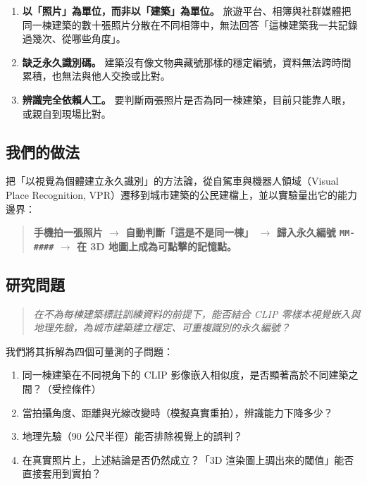 \documentclass[11pt,a4paper,fontset=windows]{ctexart}
\begin{document}
\begin{enumerate}[leftmargin=1.4em,itemsep=2pt]
  \item \textbf{以「照片」為單位，而非以「建築」為單位。} 旅遊平台、相簿與社群媒體把同一棟建築的數十張照片分散在不同相簿中，無法回答「這棟建築我一共記錄過幾次、從哪些角度」。
  \item \textbf{缺乏永久識別碼。} 建築沒有像文物典藏號那樣的穩定編號，資料無法跨時間累積，也無法與他人交換或比對。
  \item \textbf{辨識完全依賴人工。} 要判斷兩張照片是否為同一棟建築，目前只能靠人眼，或親自到現場比對。
\end{enumerate}

\subsection{我們的做法}
把「以視覺為個體建立永久識別」的方法論，從自駕車與機器人領域（Visual Place Recognition, VPR）遷移到城市建築的公民建檔上，並以實驗量出它的能力邊界：

\begin{quote}
\textbf{手機拍一張照片 $\rightarrow$ 自動判斷「這是不是同一棟」 $\rightarrow$ 歸入永久編號 \texttt{MM-\#\#\#\#} $\rightarrow$ 在 3D 地圖上成為可點擊的記憶點。}
\end{quote}

\subsection{研究問題}
\begin{quote}
\itshape
在不為每棟建築標註訓練資料的前提下，能否結合 CLIP 零樣本視覺嵌入與地理先驗，為城市建築建立穩定、可重複識別的永久編號？
\end{quote}

\noindent 我們將其拆解為四個可量測的子問題：
\begin{enumerate}[leftmargin=1.4em,itemsep=2pt]
  \item 同一棟建築在不同視角下的 CLIP 影像嵌入相似度，是否顯著高於不同建築之間？（受控條件）
  \item 當拍攝角度、距離與光線改變時（模擬真實重拍），辨識能力下降多少？
  \item 地理先驗（90 公尺半徑）能否排除視覺上的誤判？
  \item 在真實照片上，上述結論是否仍然成立？「3D 渲染圖上調出來的閾值」能否直接套用到實拍？
\end{enumerate}

\end{document}
